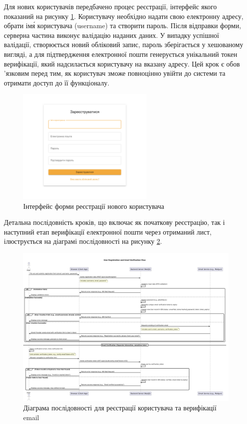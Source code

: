 Для нових користувачів передбачено процес реєстрації, інтерфейс якого показаний на рисунку \ref{fig:registration_form}. Користувачу необхідно надати свою електронну адресу, обрати ім\'я користувача (username) та створити пароль. Після відправки форми, серверна частина виконує валідацію наданих даних. У випадку успішної валідації, створюється новий обліковий запис, пароль зберігається у хешованому вигляді, а для підтвердження електронної пошти генерується унікальний токен верифікації, який надсилається користувачу на вказану адресу. Цей крок є обов\\'язковим перед тим, як користувач зможе повноцінно увійти до системи та отримати доступ до її функціоналу.

\begin{figure}[htbp]
    \centering
    \includegraphics[width=0.6\textwidth]{practice_report/images/registration_form.png}
    \caption{Інтерфейс форми реєстрації нового користувача}
    \label{fig:registration_form}
\end{figure}

Детальна послідовність кроків, що включає як початкову реєстрацію, так і наступний етап верифікації електронної пошти через отриманий лист, ілюструється на діаграмі послідовності на рисунку \ref{fig:local_registration_flow}.

\begin{figure}[htbp]
    \centering
    \includegraphics[width=\textwidth]{practice_report/images/local_registration_flow.png}
    \caption{Діаграма послідовності для реєстрації користувача та верифікації email}
    \label{fig:local_registration_flow}
\end{figure}

